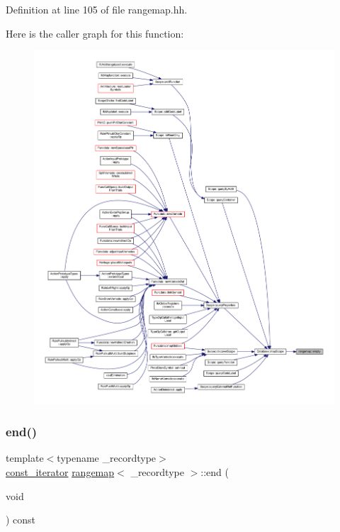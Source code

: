 Definition at line 105 of file rangemap.\+hh.

Here is the caller graph for this function\+:
\nopagebreak
\begin{figure}[H]
\begin{center}
\leavevmode
\includegraphics[width=350pt]{classrangemap_a53aa8a0c0d7a81df126f69a8ad2ba8de_icgraph}
\end{center}
\end{figure}
\mbox{\label{classrangemap_a94d0670391a58a9f30031801c4eeff49}} 
\subsubsection{\texorpdfstring{end()}{end()}}
{\footnotesize\ttfamily template$<$typename \+\_\+recordtype$>$ \\
\mbox{\hyperlink{classrangemap_affa7462e68d053d3a066fe0b8d46a99d}{const\+\_\+iterator}} \mbox{\hyperlink{classrangemap}{rangemap}}$<$ \+\_\+recordtype $>$\+::end (\begin{DoxyParamCaption}\item[{void}]{ }\end{DoxyParamCaption}) const\hspace{0.3cm}{\ttfamily [inline]}}




